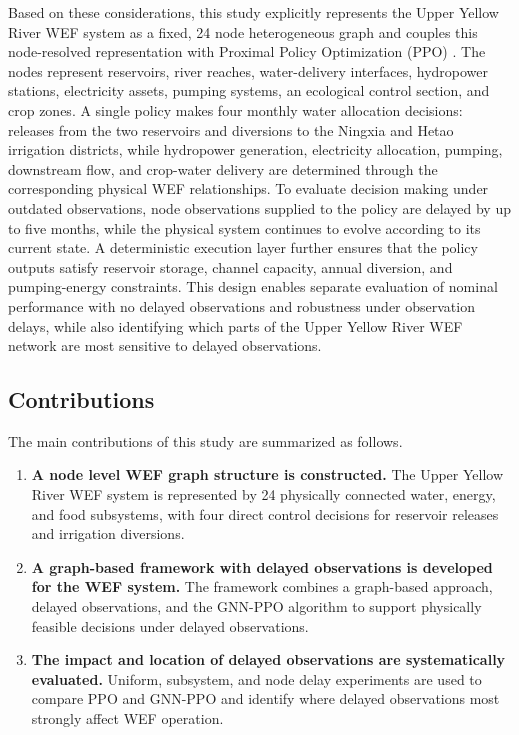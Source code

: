 \documentclass [a4paper,fleqn] {cas-dc}
\begin{document}
Based on these considerations, this study explicitly represents the Upper Yellow River WEF system as a fixed, 24 node heterogeneous graph and couples this node-resolved representation with Proximal Policy Optimization (PPO) \citep{yu2022}. The nodes represent reservoirs, river reaches, water-delivery interfaces, hydropower stations, electricity assets, pumping systems, an ecological control section, and crop zones. A single policy makes four monthly water allocation decisions: releases from the two reservoirs and diversions to the Ningxia and Hetao irrigation districts, while hydropower generation, electricity allocation, pumping, downstream flow, and crop-water delivery are determined through the corresponding physical WEF relationships. To evaluate decision making under outdated observations, node observations supplied to the policy are delayed by up to five months, while the physical system continues to evolve according to its current state. A deterministic execution layer further ensures that the policy outputs satisfy reservoir storage, channel capacity, annual diversion, and pumping-energy constraints. This design enables separate evaluation of nominal performance with no delayed observations and robustness under observation delays, while also identifying which parts of the Upper Yellow River WEF network are most sensitive to delayed observations.



\subsection{Contributions}
\label{sec12}

The main contributions of this study are summarized as follows.

\begin{enumerate}

    \item \textbf{A node level WEF graph structure is constructed.}
    The Upper Yellow River WEF system is represented by 24 physically connected water, energy, and food subsystems, with four direct control decisions for reservoir releases and irrigation diversions.

    \item \textbf{A graph-based framework with delayed observations is developed for the WEF system.}
    The framework combines a graph-based approach, delayed observations, and the GNN-PPO algorithm to support physically feasible decisions under delayed observations.

    \item \textbf{The impact and location of delayed observations are systematically evaluated.}
    Uniform, subsystem, and node delay experiments are used to compare PPO and GNN-PPO and identify where delayed observations most strongly affect WEF operation.

\end{enumerate}
\end{document}
